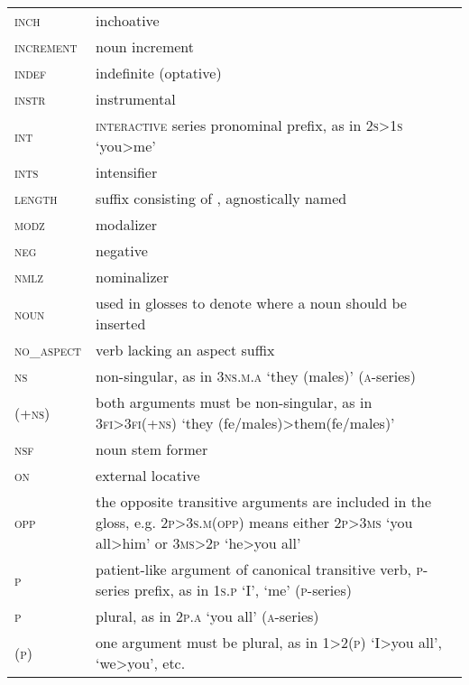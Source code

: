 \begin{tabularx}{\textwidth}{lQ}
\textsc{inch}            &      inchoative                            \\
\textsc{increment}            &      noun increment                        \\
\textsc{indef}             &      indefinite  (optative)                          \\
\textsc{instr}           &      instrumental                          \\
\textsc{int}	& \textsc{interactive} series pronominal prefix, as in \textsc{2s>1s} ‘you>me’\\
\textsc{ints}            &      intensifier                           \\
\textsc{length}	&	suffix consisting of \stem{-:}, agnostically named \\
\textsc{modz}            &      modalizer                             \\
\textsc{neg}             &      negative                              \\
\textsc{nmlz}             &      nominalizer                           \\
\textsc{noun}	&	used in glosses to denote where a noun should be inserted \\
\textsc{no\_aspect}	&	verb lacking an aspect suffix \\
\textsc{ns}	&	non-singular, as in \textsc{3ns.m.a} ‘they (males)’ (\textsc{a}-series) \\
\textsc{(+ns)}	&	both arguments must be non-singular, as in \textsc{3fi>3fi(+ns)} ‘they (fe/males)>them(fe/males)’ \\	
\textsc{nsf}             &      noun stem former                      \\
\textsc{on}           &       external locative               \\
\textsc{opp}	&	the opposite transitive arguments are included in the gloss, e.g. \textsc{2p>3s.m(opp)} means either \textsc{2p>3ms} ‘you all>him’ or \textsc{3ms>2p} ‘he>you all’  \\
\textsc{p}	&	patient-like argument of canonical transitive verb, \textsc{p}-series prefix, as in \textsc{1s.p} ‘I’, ‘me’ (\textsc{p}-series)  \\
\textsc{p}   &   plural, as in \textsc{2p.a} ‘you all’ (\textsc{a}-series) \\
\textsc{(p)}	&	one argument must be plural, as in \textsc{1>2(p)} ‘I>you all’, ‘we>you’, etc.  \\

\end{tabularx}
